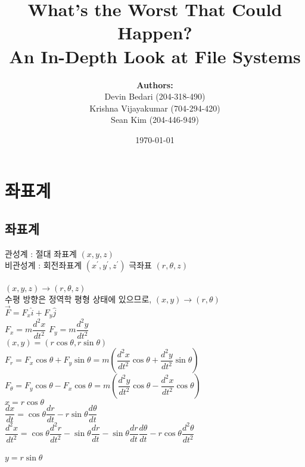 \documentclass[a4paper]{article}
\title{What's the Worst That Could Happen? \\ \large\textbf{An In-Depth Look at File Systems}}
\author{\textbf{Authors:}\\ Devin Bedari (204-318-490)\\
Krishna Vijayakumar (704-294-420)\\
Sean Kim (204-446-949)}
\date{\today}
\begin{document}
\maketitle





\section{좌표계}

\subsection{좌표계}

관성계 : 절대 좌표계 $ (x, y, z)$ \\
비관성계 : 회전좌표계 $ (x^{\prime}, y^{\prime}, z^{\prime})$ 
극좌표 $ (r, \theta, z)$\\
\\
$ (x, y, z) 	\rightarrow (r, \theta, z)$\\
수평 방향은 정역학 평형 상태에 있으므로, 	
$ (x, y) 	\rightarrow (r, \theta)$\\

$ \overrightarrow {F} = F_{x} \hat{i}  + F_{y} \hat{j} $\\

$ F_{x} = m \dfrac{d^{2}x}{dt^{2}}$
$ F_{y} = m \dfrac{d^{2}y}{dt^{2}}$\\

$ (x, y) = (r \cos \theta, r \sin \theta)$\\

$ F_{r} = F_{x} \cos \theta + F_{y} \sin \theta 
= m \left ( \dfrac{d^{2}x}{dt^{2}} \cos \theta + \dfrac{d^{2}y}{dt^{2}} \sin \theta \right) $\\

$ F_{\theta} = F_{y} \cos \theta - F_{x} \cos \theta 
= m \left ( \dfrac{d^{2}y}{dt^{2}} \cos \theta - \dfrac{d^{2}x}{dt^{2}} \cos \theta \right) $\\

$ x = r \cos \theta $ \\

$\dfrac{dx}{dt} = \cos \theta \dfrac{dr}{dt} - r \sin \theta \dfrac{d\theta}{dt}$ \\

$\dfrac{d^{2}x}{dt^{2}} = \cos \theta \dfrac{d^{2}r}{dt^{2}} - \sin \theta \dfrac{dr}{dt} - \sin \theta \dfrac{dr}{dt} \dfrac{d\theta}{dt} -r \cos \theta \dfrac{d^{2}\theta}{dt^{2}}$\\
\\
$ y = r \sin \theta $ \\
\end{document}
